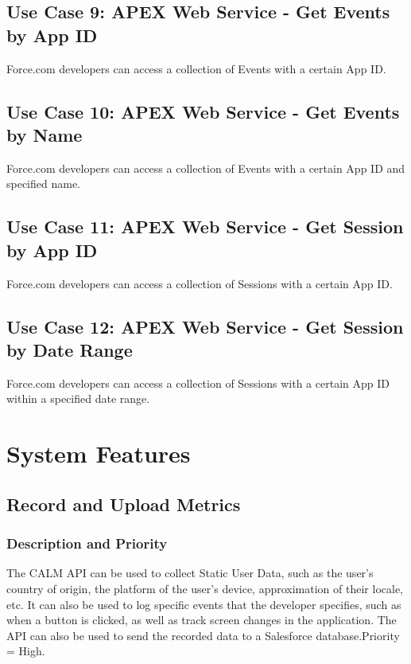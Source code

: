 \documentclass[12pt,oneside,letterpaper]{article}
\begin{document}
\subsection{\label{WebService}Use Case 9: APEX Web Service - Get Events by App ID}
Force.com developers can access a collection of Events with a certain App ID.\\

\subsection{\label{WebService}Use Case 10: APEX Web Service - Get Events by Name}
Force.com developers can access a collection of Events with a certain App ID and specified name.\\

\subsection{\label{WebService}Use Case 11: APEX Web Service - Get Session by App ID}
Force.com developers can access a collection of Sessions with a certain App ID.\\

\subsection{\label{WebService}Use Case 12: APEX Web Service - Get Session by Date Range}
Force.com developers can access a collection of Sessions with a certain App ID within a specified date range.\\



\section{System Features}

\subsection{Record and Upload Metrics} 
\subsubsection{Description and Priority}
The CALM API can be used to collect Static User Data, such as the user's country of origin, the 
platform of the user's device, approximation of their locale, etc. It 
can also be used to log specific events that the developer specifies, such as 
when a button is clicked, as well as track screen changes in the application. The API can also be used to send
the recorded data to a Salesforce database.\newline Priority = High.
\end{document}
